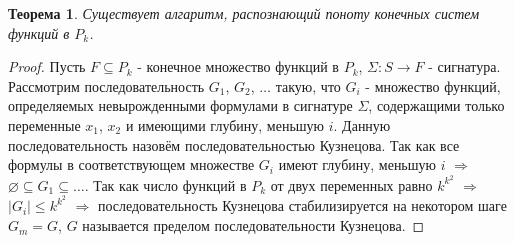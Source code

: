 \documentclass[a4paper, 12pt]{article}
\theoremstyle{definition}
\theoremstyle{plain}
\newtheorem*{theorem}{Теорема}
\theoremstyle{remark}
\begin{document}
  \begin{theorem}
    Существует алгаритм, распознающий поноту конечных систем функций в $P_k$.
  \end{theorem}
  \begin{proof}
    Пусть $F\subseteq P_k$ - конечное множество функций в $P_k$, $\Sigma:S\to F$ - сигнатура. Рассмотрим последовательность $G_1$, $G_2$, $\ldots$ такую, что $G_i$ - множество функций, определяемых невырожденными формулами в сигнатуре $\Sigma$, содержащими только переменные $x_1$, $x_2$ и имеющими глубину, меньшую $i$. Данную последовательность назовём последовательностью Кузнецова. Так как все формулы в соответствующем множестве $G_i$ имеют глубину, меньшую $i$ $\Longrightarrow$ $\varnothing\subseteq G_1\subseteq\ldots$. Так как число функций в $P_k$ от двух переменных равно $k^{k^2}$ $\Longrightarrow$ $|G_i|\leqslant k^{k^2}$ $\Longrightarrow$ последовательность Кузнецова стабилизируется на некотором шаге $G_m=G$, $G$ называется пределом последовательности Кузнецова.
  \end{proof}
\end{document}
